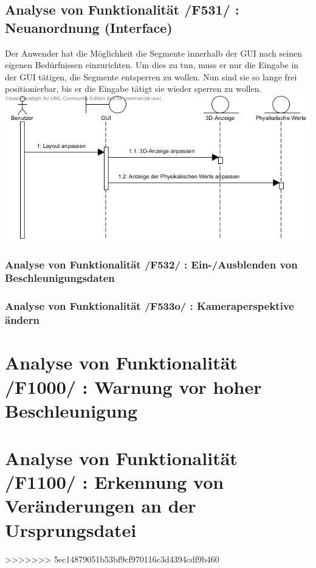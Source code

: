 \subsection{Analyse von Funktionalität /F531/ :   Neuanordnung (Interface)}
Der Anwender hat die Möglichkeit die Segmente innerhalb der GUI nach seinen eigenen Bedürfnissen einzurichten. Um dies zu tun, muss er nur die Eingabe in der GUI tätigen, die Segmente entsperren zu wollen.
Nun sind sie so lange frei positionierbar, bis er die Eingabe tätigt sie wieder sperren zu wollen.
\includegraphics[width=16cm]{bilder/Interface_Neuanordnung}
\subsubsection{Analyse von Funktionalität /F532/ :  Ein-/Ausblenden von Beschleunigungsdaten}
\subsubsection{Analyse von Funktionalität /F533o/ :  Kameraperspektive ändern}
\section{Analyse von Funktionalität /F1000/ :  Warnung vor hoher Beschleunigung}
\section{Analyse von Funktionalität /F1100/ :  Erkennung von Veränderungen an der Ursprungsdatei}
>>>>>>> 5ec14879051b53bf9cf970116c3d4394cdf9b460
